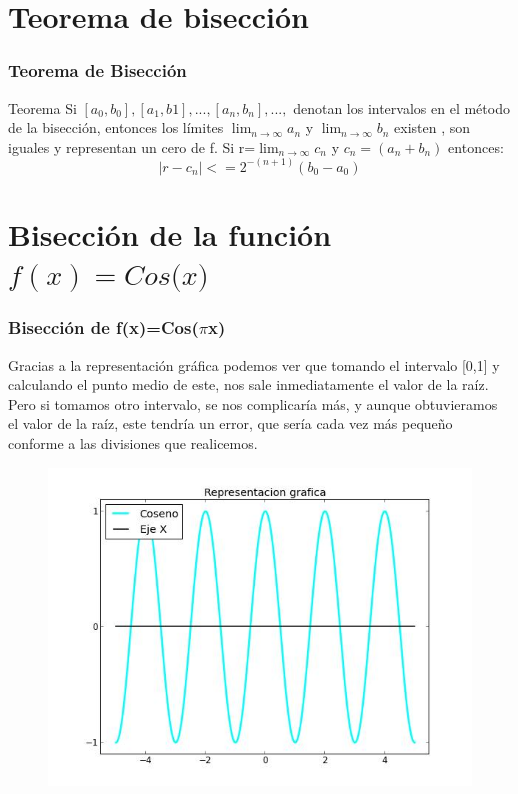 \documentclass{beamer}
\begin{document}
\section{Teorema de bisección}

\begin{frame}
\frametitle{Teorema de Bisección}
\begin{block}{Teorema}
Si $[a_0, b_0],[a_1,b1],...,[a_n,b_n],...,$ denotan los intervalos en el método de la bisección, entonces los límites $\lim_{n\rightarrow \infty} a_n$ y $\lim_{n\rightarrow \infty}b_n $ existen , son iguales y representan un cero de f. Si r=$\lim_{n\rightarrow \infty}c_n$ y $c_n=(a_n+b_n)$ entonces: $$|r-c_n|<=2^{-(n+1)} (b_0 - a_0)$$
\end{block}

\end{frame}


\section{Bisección de la función $f(x)=Cos($\pi$x)$} 

\begin{frame}
\frametitle{Bisección de f(x)=Cos($\pi$x)}

\begin{block}{}
Gracias a la representación gráfica podemos ver que tomando el intervalo [0,1] y calculando el punto medio de este, nos sale inmediatamente el valor de la raíz. Pero si tomamos otro intervalo, se nos complicaría más, y aunque obtuvieramos el valor de la raíz, este tendría un error, que sería cada vez más pequeño conforme a las divisiones que realicemos.
\end{block}

\begin{figure}[b]
\begin{center}
\includegraphics[scale=0.3]{cos.jpeg}
\end{center}
\end{figure}

\end{frame}
\end{document}
